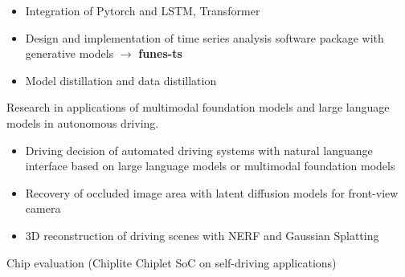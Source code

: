 \documentclass[../cv.tex]{subfiles}
\begin{document}
\begin{cventries}
{\begin{cvitems}
\begin{itemize}
				\item Integration of Pytorch and LSTM, Transformer
				\item Design and implementation of time series analysis software package with generative models
				      $\rightarrow$ \textbf{funes-ts} \href{https://github.com/binjian/funes-ts/}{\faGithub}
				\item Model distillation and data distillation
			\end{itemize}
			\item Research in applications of multimodal foundation models and large language models in autonomous driving.
			\begin{itemize}
				\item Driving decision of automated driving systems with natural languange interface based on large language models or multimodal foundation models \supercite{Xin_LLM_24}  \supercite{Xin_VLM_24}
				\item Recovery of occluded image area with latent diffusion models for front-view camera \supercite{Xin_Latent_Diffusion_23}
				\item 3D reconstruction of driving scenes with NERF and Gaussian Splatting
			\end{itemize}
			\item Chip evaluation (Chiplite Chiplet SoC on self-driving applications)
		\end{cvitems}
	}


\end{cventries}
\end{document}
